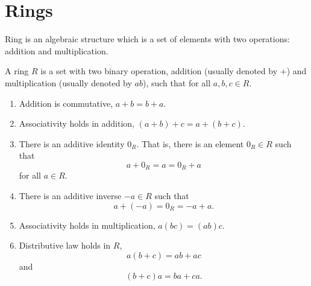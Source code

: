 \chapter{Rings}

Ring is an algebraic structure which is a set of elements with two operations: addition and multiplication.

\begin{axiom}[Rings]
    A ring $R$ is a set with two binary operation, addition (usually denoted by $+$) and multiplication 
    (usually denoted by $ab$), such that for all $a,b,c \in R$.
    \begin{enumerate}
        \item Addition is commutative, $a + b = b + a$.
        \item Associativity holds in addition, $(a + b) + c = a + (b + c)$.
        \item There is an additive identity $0_R$. That is, there is an element $0_R \in R$ such that 
        \[
            a + 0_R = a = 0_R + a
        \]
        for all $a \in R$.
        \item There is an additive inverse $-a \in R$ such that
        \[
            a + (-a) = 0_R = -a + a.
        \]
        \item Associativity holds in multiplication, $a(bc)=(ab)c$.
        \item Distributive law holds in $R$, 
        \[
            a(b+c) = ab + ac 
        \]
        and 
        \[
            (b+c)a = ba + ca.
        \]
    \end{enumerate}
\end{axiom}

